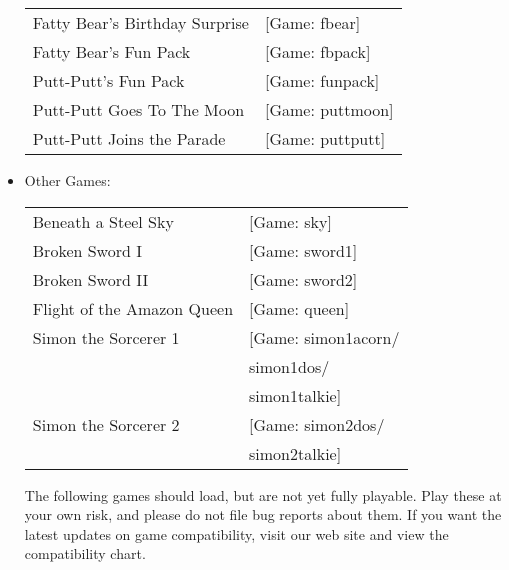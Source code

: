 \begin{itemize}
\begin {tabular} [h] {ll}
    Fatty Bear's Birthday Surprise&                [Game: fbear]\\
    Fatty Bear's Fun Pack&                         [Game: fbpack]\\
    Putt-Putt's Fun Pack&                          [Game: funpack]\\
    Putt-Putt Goes To The Moon&                    [Game: puttmoon]\\
    Putt-Putt Joins the Parade&                    [Game: puttputt]\\
  \end{tabular}
\item Other Games:\\ 
  \begin{tabular}[h]{ll}
     Beneath a Steel Sky&                             [Game: sky]\\
    Broken Sword I&                                [Game: sword1]\\
    Broken Sword II&                               [Game: sword2]\\
    Flight of the Amazon Queen&                    [Game: queen]\\
     Simon the Sorcerer 1&                         [Game: simon1acorn/\\
     &                                                    simon1dos/\\
     &                                                    simon1talkie]\\
     Simon the Sorcerer 2&                         [Game: simon2dos/\\
     &                                                    simon2talkie]\\
  \end{tabular}

  The following games should load, but are not yet fully playable. Play these at your own risk, and please do not file bug reports about them. If you want
the latest updates on game compatibility, visit our web site and view the
compatibility chart.


\end{itemize}
